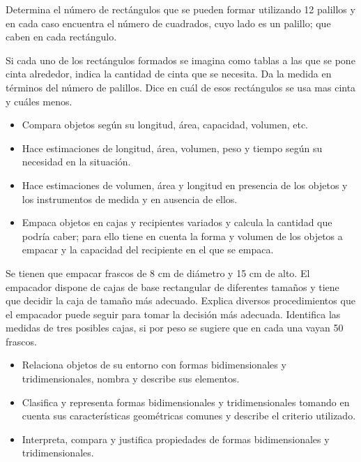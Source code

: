 \ejemplo

Determina el número de rectángulos que se pueden formar utilizando 12 palillos y en cada caso encuentra el número de cuadrados, cuyo lado es un palillo; que caben en cada rectángulo.


Si cada uno de los rectángulos formados se imagina como tablas a las que se pone cinta alrededor, indica la cantidad de cinta que se necesita. Da la medida en términos del número de palillos. Dice en cuál de esos rectángulos se usa mas cinta y cuáles menos.


\evidencias

\begin{itemize}
  \item Compara objetos según su longitud, área, capacidad, volumen, etc.
  \item Hace estimaciones de longitud, área, volumen, peso y tiempo según su necesidad en la situación.
  \item Hace estimaciones de volumen, área y longitud en presencia de los objetos y los instrumentos de medida y en ausencia de ellos.
  \item Empaca objetos en cajas y recipientes variados y calcula la cantidad que podría caber; para ello tiene en cuenta la forma y volumen de los objetos a empacar y la capacidad del recipiente en el que se empaca.
\end{itemize}

\ejemplo

Se tienen que empacar frascos de 8 cm de diámetro y 15 cm de alto. El empacador dispone de cajas de base rectangular de diferentes tamaños y tiene que decidir la caja de tamaño más adecuado. Explica diversos procedimientos que el empacador puede seguir para tomar la decisión más adecuada. Identifica las medidas de tres posibles cajas, si por peso se sugiere que en cada una vayan 50 frascos.


\evidencias

\begin{itemize}
  \item Relaciona objetos de su entorno con formas bidimensionales y tridimensionales, nombra y describe sus elementos.
  \item Clasifica y representa formas bidimensionales y tridimensionales tomando en cuenta sus características geométricas comunes y describe el criterio utilizado.
  \item Interpreta, compara y justifica propiedades de formas bidimensionales y tridimensionales.
\end{itemize}

